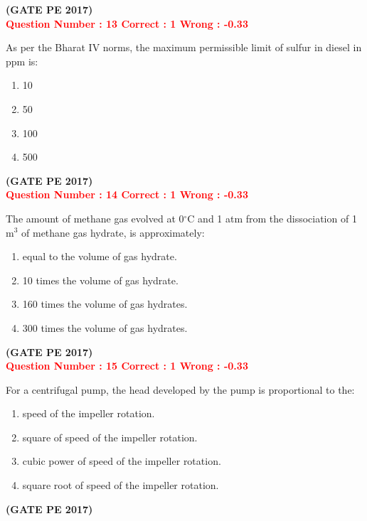 \documentclass[12pt]{article}
\begin{document}
{\hfill\textbf{(GATE PE 2017)}\\[0.6cm]


\textcolor{red}{\textbf{Question Number : 13 \hfill Correct : 1  Wrong : -0.33}}

As per the Bharat IV norms, the maximum permissible limit of sulfur in diesel in ppm is:

\begin{enumerate}[label=(\Alph*)]
    \item 10
    \item 50
    \item 100
    \item 500
\end{enumerate}

\hfill\textbf{(GATE PE 2017)}\\[0.6cm]


\textcolor{red}{\textbf{Question Number : 14 \hfill Correct : 1  Wrong : -0.33}}

The amount of methane gas evolved at 0$^\circ$C and 1 atm from the dissociation of 1 m$^3$ of methane gas hydrate, is approximately:

\begin{enumerate}[label=(\Alph*)]
    \item equal to the volume of gas hydrate.
    \item 10 times the volume of gas hydrate.
    \item 160 times the volume of gas hydrates.
    \item 300 times the volume of gas hydrates.
\end{enumerate}

\hfill\textbf{(GATE PE 2017)}\\[0.6cm]


\textcolor{red}{\textbf{Question Number : 15 \hfill Correct : 1  Wrong : -0.33}}

For a centrifugal pump, the head developed by the pump is proportional to the:

\begin{enumerate}[label=(\Alph*)]
    \item speed of the impeller rotation.
    \item square of speed of the impeller rotation.
    \item cubic power of speed of the impeller rotation.
    \item square root of speed of the impeller rotation.
\end{enumerate}
\hfill\textbf{(GATE PE 2017)}\\[0.6cm]

}
\end{document}
